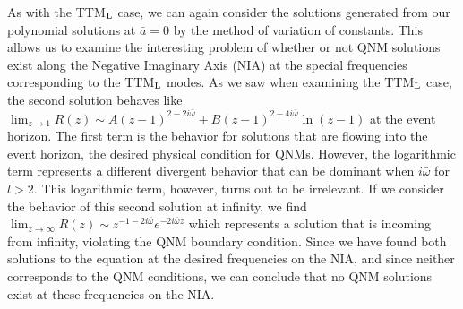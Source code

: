 \documentclass[11pt]{article}
\begin{document}
As with the TTM${}_{\rm L}$ case, we can again consider the solutions
generated from our polynomial solutions at $\bar{a}=0$ by the method
of variation of constants.  This allows us to examine the interesting
problem of whether or not QNM solutions exist along the Negative
Imaginary Axis (NIA) at the special frequencies corresponding to the
TTM${}_{\rm L}$ modes.  As we saw when examining the TTM${}_{\rm L}$
case, the second solution behaves like $\lim_{z\to1}R(z)\sim
A(z-1)^{2-2i\bar\omega}+B(z-1)^{2-4i\bar\omega}\ln(z-1)$ at the event
horizon.  The first term is the behavior for solutions that are
flowing into the event horizon, the desired physical condition for
QNMs.  However, the logarithmic term represents a different divergent
behavior that can be dominant when $i\bar\omega$ for $l>2$.  This
logarithmic term, however, turns out to be irrelevant.  If we consider
the behavior of this second solution at infinity, we find
$\lim_{z\to\infty}R(z)\sim z^{-1-2i\bar\omega}e^{-2i\bar\omega z}$
which represents a solution that is incoming from infinity, violating
the QNM boundary condition.  Since we have found both solutions
to the equation at the desired frequencies on the NIA, and since 
neither corresponds to the QNM conditions, we can conclude that
no QNM solutions exist at these frequencies on the NIA.
\end{document}
